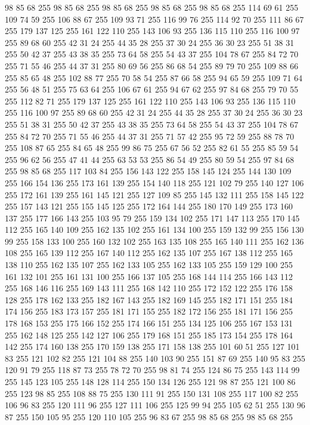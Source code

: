 98 85 68 255 98 85 68 255 98 85 68 255 98 85 68 255 98 85 68 255 114 69 61 255 109 74 59 255 106 88 67 255 109 93 71 255 116 99 76 255 114 92 70 255 111 86 67 255 179 137 125 255 161 122 110 255 143 106 93 255 136 115 110 255 116 100 97 255 89 68 60 255 42 31 24 255 44 35 28 255 37 30 24 255 36 30 23 255 51 38 31 255 50 42 37 255 43 38 35 255 73 64 58 255 54 43 37 255 104 78 67 255 84 72 70 255 71 55 46 255 44 37 31 255 80 69 56 255 86 68 54 255 89 79 70 255 109 88 66 255 85 65 48 255 102 88 77 255 70 58 54 255 87 66 58 255 94 65 59 255 109 71 64 255 56 48 51 255 75 63 64 255 106 67 61 255 94 67 62 255 97 84 68 255 79 70 55 255 112 82 71 255 179 137 125 255 161 122 110 255 143 106 93 255 136 115 110 255 116 100 97 255 89 68 60 255 42 31 24 255 44 35 28 255 37 30 24 255 36 30 23 255 51 38 31 255 50 42 37 255 43 38 35 255 73 64 58 255 54 43 37 255 104 78 67 255
84 72 70 255 71 55 46 255 44 37 31 255 71 57 42 255 95 72 59 255 88 78 70 255 108 87 65 255 84 65 48 255 99 86 75 255 67 56 52 255 82 61 55 255 85 59 54 255 96 62 56 255 47 41 44 255 63 53 53 255 86 54 49 255 80 59 54 255 97 84 68 255 98 85 68 255 117 103 84 255 156 143 122 255 158 145 124 255 144 130 109 255 166 154 136 255 173 161 139 255 154 140 118 255 121 102 79 255 140 127 106 255 172 161 139 255 161 145 121 255 127 109 85 255 145 132 111 255 158 145 122 255 157 143 121 255 155 145 125 255 172 164 144 255 180 170 149 255 173 160 137 255 177 166 143 255 103 95 79 255 159 134 102 255 171 147 113 255 170 145 112 255 165 140 109 255 162 135 102 255 161 134 100 255 159 132 99 255 156 130 99 255 158 133 100 255 160 132 102 255 163 135 108 255 165 140 111 255 162 136 108 255 165 139 112 255 167 140 112 255 162 135 107 255 167 138 112 255 165 138 110 255 162 135 107 255 162 133 105 255 162 133 105 255 159 129 100 255 161 132 101 255 161 131 100 255
166 137 105 255 168 144 114 255 166 143 112 255 168 146 116 255 169 143 111 255 168 142 110 255 172 152 122 255 176 158 128 255 178 162 133 255 182 167 143 255 182 169 145 255 182 171 151 255 184 174 156 255 183 173 157 255 181 171 155 255 182 172 156 255 181 171 156 255 178 168 153 255 175 166 152 255 174 166 151 255 134 125 106 255 167 153 131 255 162 148 125 255 142 127 106 255 179 168 151 255 185 173 154 255 178 164 142 255 174 160 138 255 170 159 138 255 171 158 138 255 101 60 51 255 127 101 83 255 121 102 82 255 121 104 88 255 140 103 90 255 151 87 69 255 140 95 83 255 120 91 79 255 118 87 73 255 78 72 70 255 98 81 74 255 124 86 75 255 143 114 99 255 145 123 105 255 148 128 114 255 150 134 126 255 121 98 87 255 121 100 86 255 123 98 85 255 108 88 75 255 130 111 91 255 150 131 108 255 117 100 82 255 106 96 83 255 120 111 96 255 127 111 106 255 125 99 94 255 105 62 51 255 130 96 87 255 150 105 95 255 120 110 105 255 96 83 67 255 98 85 68 255 98 85 68 255
